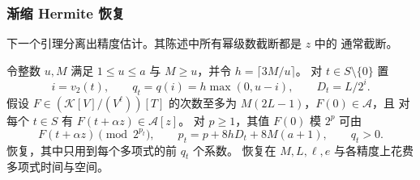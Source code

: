 \subsubsection{渐缩 Hermite 恢复}
\label{subsec:tensor-hermite}

下一个引理分离出精度估计。其陈述中所有幂级数截断都是 $z$ 中的
通常截断。

\begin{lemma}[渐缩 Hermite 恢复]\label{lem:tapered-hermite}
令整数 $u,M$ 满足 $1\le u\le a$ 与 $M\ge u$，并令
$h=\lceil3M/u\rceil$。
对 $t\in S\setminus\{0\}$ 置
\[
 i=v_2(t),\qquad q_t=q(i)=h\max(0,u-i),\qquad D_t=L/2^i.
\]
假设 $F\in(\mathcal K[V]/(V^\ell))[T]$ 的次数至多为
$M(2L-1)$，$F(0)\in\mathcal A$，且
对每个 $t\in S$ 有 $F(t+\alpha z)\in\mathcal A[z]$。
对 $p\ge1$，其值 $F(0)$ 模 $2^p$ 可由
\[
 F(t+\alpha z)\pmod{2^{p_t}},
 \qquad
 p_t=p+8hD_t+8M(a+1),\qquad q_t>0.
\]
恢复，其中只用到每个多项式的前 $q_t$ 个系数。
恢复在 $M,L,\ell,e$ 与各精度上花费多项式时间与空间。
\end{lemma}
